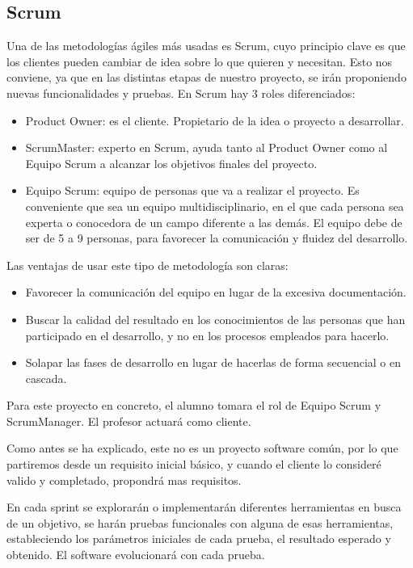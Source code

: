 \subsection{Scrum}
Una de las metodologías ágiles más usadas es Scrum, cuyo principio clave es que los clientes pueden cambiar de idea sobre lo que quieren y necesitan. Esto nos conviene, ya que en las distintas etapas de nuestro proyecto, se irán proponiendo nuevas funcionalidades y pruebas.
En Scrum hay 3 roles diferenciados:
\begin{itemize}
	\item Product Owner: es el cliente. Propietario de la idea o proyecto a desarrollar. 
	\item ScrumMaster: experto en Scrum, ayuda tanto al Product Owner como al Equipo Scrum a alcanzar los objetivos finales del proyecto.
	\item Equipo Scrum: equipo de personas que va a realizar el proyecto. Es conveniente que sea un equipo multidisciplinario, en el que cada persona sea experta o conocedora de un campo diferente a las demás. El equipo debe de ser de 5 a 9 personas, para favorecer la comunicación y fluidez del desarrollo.
\end{itemize}

Las ventajas de usar este tipo de metodología son claras:
\begin{itemize}
	\item Favorecer la comunicación del equipo en lugar de la excesiva documentación.
	\item Buscar la calidad del resultado en los conocimientos de las personas que han participado en el desarrollo, y no en los procesos empleados para hacerlo.
	\item Solapar las fases de desarrollo en lugar de hacerlas de forma secuencial o en cascada.
\end{itemize}

Para este proyecto en concreto, el alumno tomara el rol de Equipo Scrum y ScrumManager. El profesor actuará como cliente.

Como antes se ha explicado, este no es un proyecto software común, por lo que partiremos desde un requisito inicial básico, y cuando el cliente lo consideré valido y completado, propondrá mas requisitos.

En cada sprint se explorarán o implementarán diferentes herramientas en busca de un objetivo, se harán pruebas funcionales con alguna de esas herramientas, estableciendo los parámetros iniciales de cada prueba, el resultado esperado y obtenido. El software evolucionará con cada prueba.


